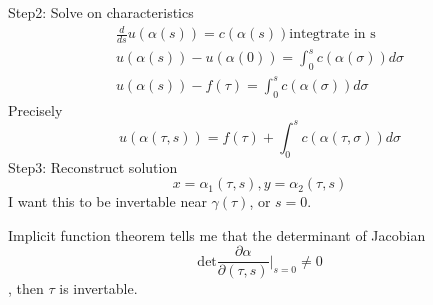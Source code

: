 \documentclass[a4paper]{article}
\theoremstyle{definition}
\begin{document}
		Step2: Solve on characteristics
		\begin{align*}
			\frac{d}{ds}u\left( \alpha\left( s \right)  \right)=c\left( \alpha\left( s \right)  \right)  \text{integtrate in s} \\
			u\left(\alpha\left( s \right)  \right)-u\left( \alpha\left( 0 \right)  \right) =\int^{s}_{0} c\left( \alpha\left( \sigma \right) \right)d\sigma\\ 
			u\left( \alpha\left( s \right)  \right)-f\left( \tau \right) =\int^{s}_{0} c\left( \alpha\left( \sigma \right)  \right) d\sigma  
		\end{align*} 
		Precisely 
		\begin{equation}
			u\left( \alpha\left( \tau,s \right)  \right) =f\left( \tau \right) +\int^{s}_{0} c\left( \alpha\left( \tau,\sigma \right)  \right) d\sigma 
		\end{equation} 
		Step3: Reconstruct solution
		\begin{equation}
			x=\alpha_1\left( \tau,s \right) ,y=\alpha_2\left( \tau,s \right) 
		\end{equation} 
		I want this to be invertable near $\gamma\left( \tau \right) $, or $s=0$. 

		Implicit function theorem tells me that the determinant of Jacobian
		\begin{equation}
			 \text{det}\frac{\partial \alpha}{\partial \left( \tau,s \right) } \bigg|_{s=0}\neq 0
		\end{equation} , then $\tau$ is invertable. 
\end{document}
